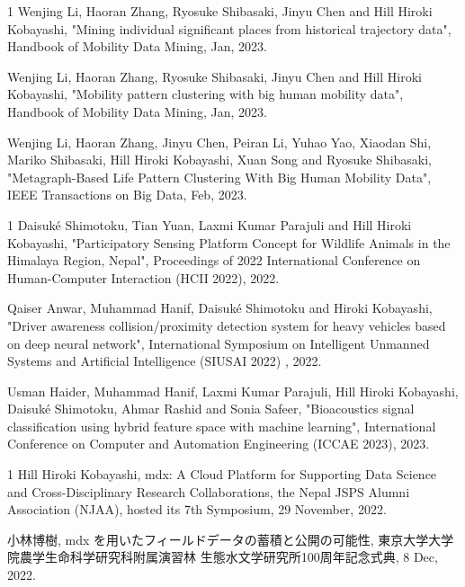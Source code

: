 

\begin{雑誌論文}{1}
Wenjing Li, Haoran Zhang, Ryosuke Shibasaki,  Jinyu Chen and Hill Hiroki Kobayashi,  "Mining individual significant places from historical trajectory data", Handbook of Mobility Data Mining, Jan, 2023.

Wenjing Li, Haoran Zhang, Ryosuke Shibasaki,  Jinyu Chen and Hill Hiroki Kobayashi,  "Mobility pattern clustering with big human mobility data", Handbook of Mobility Data Mining, Jan, 2023.

Wenjing Li, Haoran Zhang, Jinyu Chen, Peiran Li, Yuhao Yao, Xiaodan Shi,  Mariko Shibasaki, Hill Hiroki Kobayashi, Xuan Song and Ryosuke Shibasaki,  "Metagraph-Based Life Pattern Clustering With Big Human Mobility Data", IEEE Transactions on Big Data, Feb, 2023.

\end{雑誌論文}

\begin{査読付}{1}
Daisuk\'e Shimotoku, Tian Yuan, Laxmi Kumar Parajuli and Hill Hiroki Kobayashi, "Participatory Sensing Platform Concept for Wildlife Animals in the Himalaya Region, Nepal", Proceedings of 2022 International Conference on Human-Computer Interaction (HCII 2022), 2022.  

Qaiser Anwar, Muhammad Hanif, Daisuk\'e Shimotoku and  Hiroki Kobayashi, "Driver awareness collision/proximity detection system for heavy vehicles based on deep neural network", International Symposium on Intelligent Unmanned Systems and Artificial Intelligence (SIUSAI 2022) , 2022.  

Usman Haider, Muhammad Hanif, Laxmi Kumar Parajuli, Hill Hiroki Kobayashi, Daisuk\'e Shimotoku, Ahmar Rashid and Sonia Safeer, "Bioacoustics signal classification using hybrid feature space with machine learning",  International Conference on Computer and Automation Engineering (ICCAE 2023), 2023.  

\end{査読付}

\begin{招待講演}{1}
Hill Hiroki Kobayashi, mdx: A Cloud Platform for Supporting Data Science and Cross-Disciplinary Research Collaborations, the Nepal JSPS Alumni Association (NJAA), hosted its 7th Symposium, 29 November, 2022.

小林博樹, mdx を用いたフィールドデータの蓄積と公開の可能性, 東京大学大学院農学生命科学研究科附属演習林 生態水文学研究所100周年記念式典, 8 Dec, 2022.

\end{招待講演}
